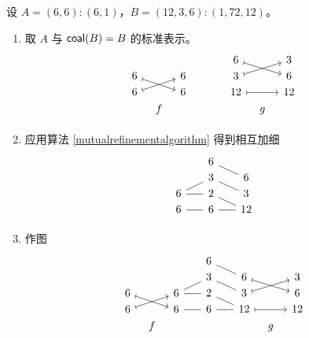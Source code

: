 \begin{example}
    设 $A = (6,6):(6,1)$，$B = (12,3,6):(1,72,12)$。
    \begin{enumerate}
        \item 取 $A$ 与 $\mathsf{coal}(B) = B$ 的标准表示。
        \[ \begin{tikzcd} [row sep = 1, column sep = 8]
         & & & & & & 6 \ar[drr,mapsto] & & 3\\
        6 \ar[drr,mapsto] & & 6 & & & & 3 \ar[urr,mapsto] & & 6\\
        6 \ar[urr,mapsto] & & 6 & & & & 12 \ar[rr,mapsto] & & 12\\
        & f & & & & & & g & \\
        \end{tikzcd} \]
        \item 应用算法 \ref{mutualrefinementalgorithm} 得到相互加细
        \[ \begin{tikzcd} [row sep = 1, column sep = 8]
           & & 6 \ar[-,drr] & &  \\
          & & 3 \ar[-,drr] & & 6 \\
         6  \ar[-,urr] \ar[-,rr]  & & 2 \ar[-,drr] & & 3 \\
        6 \ar[rr,-] & & 6 \ar[-,swap,rr] & & 12 \\
           &  & &  &  \\
        \end{tikzcd} \]
        \item 作图
        \[
\begin{tikzcd}[row sep = 1,column sep = 8]
  & &   & & 6  \ar[drr,-] & &    & &\\
  & &   & & 3 \ar[drr,-]  & & 6  \ar[drr,mapsto] & & 3\\
6 \ar[drr,mapsto] & & 6 \ar[rr,-] \ar[rru,-] & & 2 \ar[drr,-]& & 3  \ar[urr,mapsto] & & 6\\
6 \ar[urr,mapsto] & & 6 \ar[rr,-]  & & 6 \ar[rr,-] & & 12 \ar[rr,mapsto] & & 12 \\
 & f & &  & & &    &g& \\
\end{tikzcd}
\]


\end{enumerate}
\end{example}
